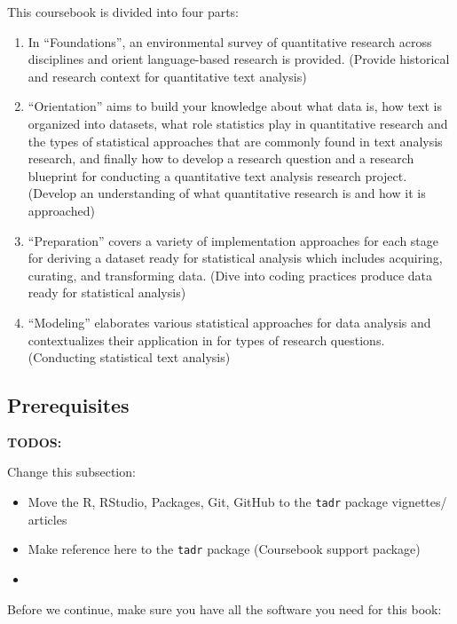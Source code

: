 \documentclass[
]{article}
\providecommand{\tightlist}{%
  \setlength{\itemsep}{0pt}\setlength{\parskip}{0pt}}
\begin{document}
This coursebook is divided into four parts:

\begin{enumerate}
\def\labelenumi{\arabic{enumi}.}
\tightlist
\item
  In ``Foundations'', an environmental survey of quantitative research across disciplines and orient language-based research is provided. (Provide historical and research context for quantitative text analysis)
\item
  ``Orientation'' aims to build your knowledge about what data is, how text is organized into datasets, what role statistics play in quantitative research and the types of statistical approaches that are commonly found in text analysis research, and finally how to develop a research question and a research blueprint for conducting a quantitative text analysis research project. (Develop an understanding of what quantitative research is and how it is approached)
\item
  ``Preparation'' covers a variety of implementation approaches for each stage for deriving a dataset ready for statistical analysis which includes acquiring, curating, and transforming data. (Dive into coding practices produce data ready for statistical analysis)
\item
  ``Modeling'' elaborates various statistical approaches for data analysis and contextualizes their application in for types of research questions. (Conducting statistical text analysis)
\end{enumerate}

\hypertarget{prerequisites}{%
\subsection{Prerequisites}\label{prerequisites}}

\textbf{TODOS:}

Change this subsection:

\begin{itemize}
\tightlist
\item
  Move the R, RStudio, Packages, Git, GitHub to the \texttt{tadr} package vignettes/ articles
\item
  Make reference here to the \texttt{tadr} package (Coursebook support package)
\item
\end{itemize}

Before we continue, make sure you have all the software you need for this book:
\end{document}
